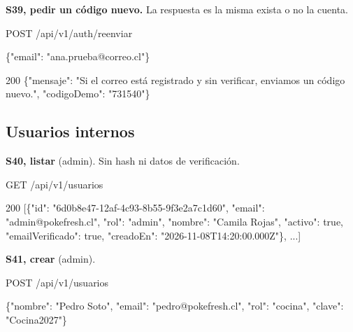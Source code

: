 \textbf{S39, pedir un código nuevo.} La respuesta es la misma exista o no la cuenta.


\begin{codigo}
POST /\allowbreak{}api/\allowbreak{}v1/\allowbreak{}auth/\allowbreak{}reenviar\par
\{"email":\allowbreak{} "ana.\allowbreak{}prueba@correo.\allowbreak{}cl"\}\par
\end{codigo}

\begin{codigo}
200 \{"mensaje":\allowbreak{} "Si el correo está registrado y sin verificar,\allowbreak{} enviamos un código nuevo.\allowbreak{}",\allowbreak{} "codigoDemo":\allowbreak{} "731540"\}\par
\end{codigo}

\subsection{Usuarios internos}

\textbf{S40, listar} (admin). Sin hash ni datos de verificación.


\begin{codigo}
GET /\allowbreak{}api/\allowbreak{}v1/\allowbreak{}usuarios\par
\end{codigo}

\begin{codigo}
200 [\allowbreak{}\{"id":\allowbreak{} "6d0b8e47-\allowbreak{}12af-\allowbreak{}4c93-\allowbreak{}8b55-\allowbreak{}9f3e2a7c1d60",\allowbreak{} "email":\allowbreak{} "admin@pokefresh.\allowbreak{}cl",\allowbreak{} "rol":\allowbreak{} "admin",\allowbreak{} "nombre":\allowbreak{} "Camila Rojas",\allowbreak{} "activo":\allowbreak{} true,\allowbreak{} "emailVerificado":\allowbreak{} true,\allowbreak{} "creadoEn":\allowbreak{} "2026-\allowbreak{}11-\allowbreak{}08T14:\allowbreak{}20:\allowbreak{}00.\allowbreak{}000Z"\},\allowbreak{} .\allowbreak{}.\allowbreak{}.\allowbreak{}]\par
\end{codigo}

\textbf{S41, crear} (admin).


\begin{codigo}
POST /\allowbreak{}api/\allowbreak{}v1/\allowbreak{}usuarios\par
\{"nombre":\allowbreak{} "Pedro Soto",\allowbreak{} "email":\allowbreak{} "pedro@pokefresh.\allowbreak{}cl",\allowbreak{} "rol":\allowbreak{} "cocina",\allowbreak{} "clave":\allowbreak{} "Cocina2027"\}\par
\end{codigo}

